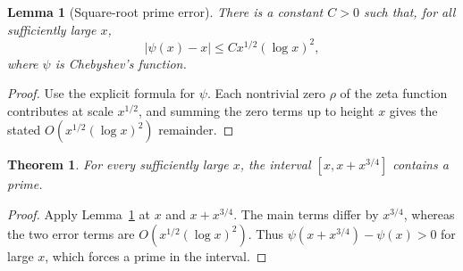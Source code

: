 \documentclass{article}
\newtheorem{theorem}{Theorem}
\newtheorem{lemma}{Lemma}
\begin{document}
\begin{lemma}[Square-root prime error]\label{lem:rh-square-root}
There is a constant $C>0$ such that, for all sufficiently large $x$,
\[
  |\psi(x)-x|\le C x^{1/2}(\log x)^2,
\]
where $\psi$ is Chebyshev's function.
\end{lemma}
\begin{proof}
Use the explicit formula for $\psi$. Each nontrivial zero $\rho$ of the
zeta function contributes at scale $x^{1/2}$, and summing the zero terms
up to height $x$ gives the stated $O(x^{1/2}(\log x)^2)$ remainder.
\end{proof}

\begin{theorem}\label{thm:rh-prime-window}
For every sufficiently large $x$, the interval
$[x,x+x^{3/4}]$ contains a prime.
\end{theorem}
\begin{proof}
Apply Lemma~\ref{lem:rh-square-root} at $x$ and $x+x^{3/4}$.
The main terms differ by $x^{3/4}$, whereas the two error terms are
$O(x^{1/2}(\log x)^2)$. Thus $\psi(x+x^{3/4})-\psi(x)>0$ for large $x$,
which forces a prime in the interval.
\end{proof}
\end{document}
